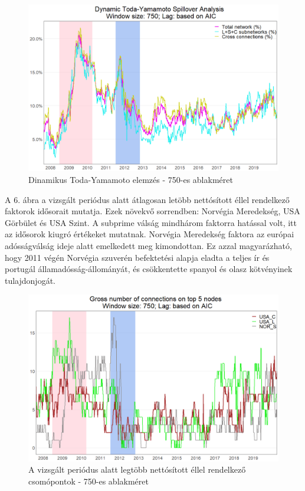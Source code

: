 \documentclass[12pt,bibliography=totoc]{article}
\begin{document}
\begin{figure}[H]
\caption{Dinamikus Toda-Yamamoto elemzés - 750-es ablakméret}
\includegraphics[width=11.5cm]{Time_series_750}
\centering
\end{figure}

A 6. ábra a vizsgált periódus alatt átlagosan letöbb nettósított éllel rendelkező faktorok idősorait mutatja. Ezek növekvő sorrendben: Norvégia Meredekség, USA Görbület és USA Szint. A subprime válság mindhárom faktorra hatással volt, itt az idősorok kiugró értékeket mutatnak. Norvégia Meredekség faktora az európai adósságválság ideje alatt emelkedett meg kimondottan. Ez azzal magyarázható, hogy 2011 végén Norvégia szuverén befektetési alapja eladta a teljes ír és portugál államadósság-állományát, és csökkentette spanyol és olasz kötvényinek tulajdonjogát.

\begin{figure}[H]
\caption{A vizsgált periódus alatt legtöbb nettósított éllel rendelkező csomópontok - 750-es ablakméret}
\includegraphics[width=11.5cm]{norway}
\centering
\end{figure}
\end{document}
